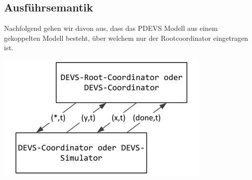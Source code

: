 \documentclass[11pt, fleqn, a4paper, leqno]{scrartcl} %
\begin{document}
	\subsection{Ausführsemantik}
	Nachfolgend gehen wir davon aus, dass das PDEVS Modell aus einem gekoppelten Modell besteht, über welchem nur der Rootcoordinator eingetragen ist.
	\begin{center}
		\includegraphics[scale=0.5]{images/devs-protokoll.jpg}
	\end{center}
\end{document}

